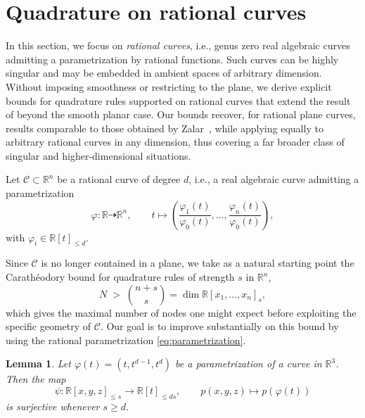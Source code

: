 \documentclass[11pt,a4paper]{amsart}
\numberwithin{equation}{section}
\newtheorem{lemma}[thm]{Lemma}
\theoremstyle{definition}
\newcommand{\R}{\mathbb{R}}
\numberwithin{thm}{section}
\theoremstyle{break}
\numberwithin{subcase}{case}
\begin{document}
\section{Quadrature on rational curves}\label{sec:rational}

In this section, we focus on \emph{rational curves}, i.e., genus zero real algebraic curves admitting a parametrization by rational functions. Such curves can be highly singular and may be embedded in ambient spaces of arbitrary dimension. Without imposing smoothness or restricting to the plane, we derive explicit bounds for quadrature rules supported on rational curves that extend the result of  beyond the smooth planar case. Our bounds recover, for rational plane curves, results comparable to those obtained by Zalar~\cite{zalar}, while applying equally to arbitrary rational curves in any dimension, thus covering a far broader class of singular and higher-dimensional situations.


Let $\mathcal C \subset \R^n$ be a rational curve of degree $d$, i.e., a real algebraic curve admitting a parametrization
\begin{equation}\label{eq:parametrization}
\varphi : \R \dashrightarrow \R^n, 
\qquad 
t \mapsto \left(\frac{\varphi_1(t)}{\varphi_0(t)}, \dots, \frac{\varphi_n(t)}{\varphi_0(t)} \right),
\end{equation}
with $\varphi_i \in \R[t]_{\leq d}$.  

Since $\mathcal C$ is no longer contained in a plane, we take as a natural starting point the Carathéodory bound for quadrature rules of strength $s$ in $\R^n$,
\[
N \;>\; \binom{n+s}{s} = \dim \R[x_1,\dots,x_n]_s,
\]
which gives the maximal number of nodes one might expect before exploiting the specific geometry of $\mathcal C$. Our goal is to improve substantially on this bound by using the rational parametrization \eqref{eq:parametrization}.
\begin{lemma}
Let $\varphi(t) = (t, t^{d-1}, t^d)$ be a parametrization of a curve in $\R^3$.  
Then the map
\[
\psi:\R[x,y,z]_{\le s} \longrightarrow \R[t]_{\le ds},
\qquad
p(x,y,z) \longmapsto p(\varphi(t))
\]
is surjective whenever $s \ge d$.
\end{lemma}
\end{document}
